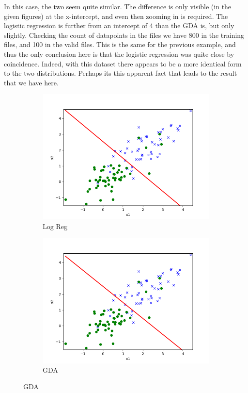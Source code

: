 \documentclass{article}
\begin{document}
In this case, the two seem quite similar. 
The difference is only visible (in the given figures) at the x-intercept, and 
even then zooming in is required. 
The logistic regression is further from an intercept of 4 than the GDA is, but
only slightly. 
Checking the count of datapoints in the files we have 800 in the training files,
and 100 in the valid files. 
This is the same for the previous example, and thus the only conclusion here is
that the logistic regression was quite close by coincidence. 
Indeed, with this dataset there appears to be a more identical form to the
two distributions. 
Perhaps its this apparent fact that leads to the result that we have here.

\begin{figure}[h]
	\centering
	\begin{subfigure}{.49\textwidth}
		\centering
		\includegraphics[width=\textwidth]{src/linearclass/ds2/logreg_pred_2.txt.png}
		\caption{Log Reg}
		\label{fig:set two LR}
	\end{subfigure}
	\hfill
	\begin{subfigure}{.49\textwidth}
		\centering
		\includegraphics[width=\textwidth]{src/linearclass/ds2/gda_pred_2.txt.png}
		\caption{GDA}
		\label{fig:set two GDA}
	\end{subfigure}
\end{figure}
\end{document}
